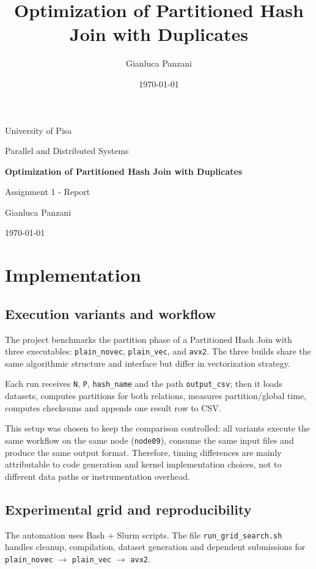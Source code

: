 \documentclass[11pt,a4paper]{article}
\title{Optimization of Partitioned Hash Join with Duplicates}
\author{Gianluca Panzani}
\date{\today}
\begin{document}
\begin{titlepage}
    \centering
    {\Large University of Pisa\par}
    \vspace{0.6cm}
    {\large Parallel and Distributed Systems\par}
    \vspace{2.0cm}
    {\LARGE \textbf{Optimization of Partitioned Hash Join with Duplicates}\par}
    \vspace{1.2cm}
    {\large Assignment 1 - Report\par}
    \vfill
    {\large Gianluca Panzani\par}
    \vspace{0.3cm}
    {\large \today\par}
\end{titlepage}

\tableofcontents
\newpage
{}

\section{Implementation}
\subsection{Execution variants and workflow}
The project benchmarks the partition phase of a Partitioned Hash Join with three executables: \texttt{plain\_novec}, \texttt{plain\_vec}, and \texttt{avx2}. The three builds share the same algorithmic structure and interface but differ in vectorization strategy.

Each run receives \texttt{N}, \texttt{P}, \texttt{hash\_name} and the path \texttt{output\_csv}; then it loads datasets, computes partitions for both relations, measures partition/global time, computes checksums and appends one result row to CSV.

This setup was chosen to keep the comparison controlled: all variants execute the same workflow on the same node (\texttt{node09}), consume the same input files and produce the same output format. Therefore, timing differences are mainly attributable to code generation and kernel implementation choices, not to different data paths or instrumentation overhead.

\subsection{Experimental grid and reproducibility}
The automation uses Bash + Slurm scripts. The file \texttt{run\_grid\_search.sh} handles cleanup, compilation, dataset generation and dependent submissions for \texttt{plain\_novec} $\rightarrow$ \texttt{plain\_vec} $\rightarrow$ \texttt{avx2}.
\end{document}
